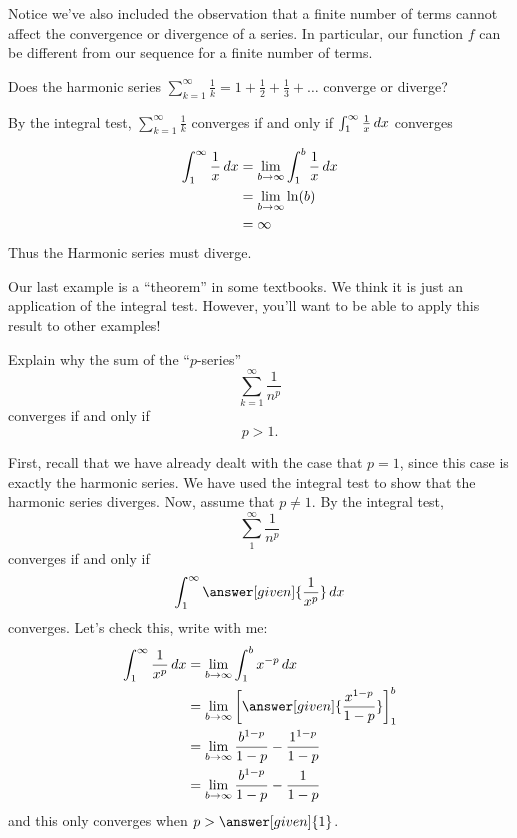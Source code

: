 \documentclass{ximera}
\begin{document}
Notice we've also included the observation that a finite number of terms 
cannot affect the convergence or divergence of a series.  In particular, 
our function $f$ can be different from our sequence for a 
finite number of terms.  

\begin{question}
  Does the harmonic series $\sum_{k=1}^\infty \frac{1}{k} = 1 + \frac{1}{2} + \frac{1}{3}+ \dots$ converge or diverge?
  \begin{multipleChoice}
  \end{multipleChoice}
  \begin{hint}
    By the integral test, $\sum_{k=1}^\infty \frac{1}{k}$ converges if
    and only if $\int_1^\infty \frac{1}{x} \mathop{}\!d x$ converges
  \end{hint}
  \begin{hint}
    \begin{align*}
      \int_1^\infty \frac{1}{x} \mathop{}\!d x &= \lim_{b \to \infty} \int_1^b \frac{1}{x} \mathop{}\!d x\\
      &=\lim_{b \to \infty} \ln(b) \\
      &=\infty
    \end{align*}
    Thus the Harmonic series must diverge.
  \end{hint}
\end{question}

Our last example is a ``theorem'' in some textbooks. We think it is
just an application of the integral test.  However, you'll want to be able 
to apply this result to other examples!

\begin{example}[$p$-test]
  Explain why the sum of the ``$p$-series''
  \[
  \sum_{k=1}^\infty \frac{1}{n^p}
  \]
  converges if and only if
  \[
  p > 1.
  \]
  \begin{explanation}
    First, recall that we have already dealt with the case that $p = 1$, since 
    this case is exactly the harmonic series.  We have used the integral test 
    to show that the harmonic series diverges.
    Now, assume that $p \ne 1$.  By the integral test,
    \[
    \sum_1^\infty \frac{1}{n^p}
    \]
    converges if and only if
    \[
    \int_1^\infty \answer[given]{\frac{1}{x^p}} \d x
    \]
    converges. Let's check this, write with me:
    \begin{align*}
      \int_1^\infty \frac{1}{x^p} \d x &= \lim_{b\to\infty} \int_1^b x^{-p} \d x\\
      &= \lim_{b\to\infty} \eval{\answer[given]{\frac{x^{1-p}}{1-p}}}_1^b\\
      &= \lim_{b\to\infty} \frac{b^{1-p}}{1-p} - \frac{1^{1-p}}{1-p}\\
      &= \lim_{b\to\infty} \frac{b^{1-p}}{1-p} - \frac{1}{1-p}
    \end{align*}
    and this only converges when $p>\answer[given]{1}$.
  \end{explanation}
\end{example}
\end{document}
